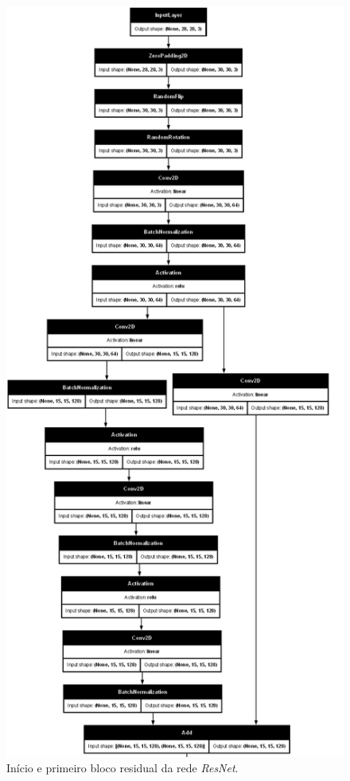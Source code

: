 \documentclass[final,5p]{elsarticle}
\numberwithin{equation}{section}
\begin{document}
        \begin{figure}[H]
            \includegraphics[width=0.95\columnwidth]{ResNet_model_upper.png}
            \caption{Início e primeiro bloco residual da rede \emph{ResNet}.}\label{fig:ModeloCNNupper}
        \end{figure}
\end{document}

